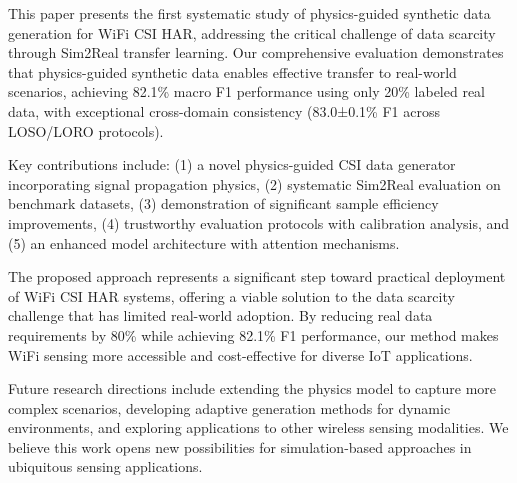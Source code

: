 \documentclass[journal]{IEEEtran}
\begin{document}
This paper presents the first systematic study of physics-guided synthetic data generation for WiFi CSI HAR, addressing the critical challenge of data scarcity through Sim2Real transfer learning. Our comprehensive evaluation demonstrates that physics-guided synthetic data enables effective transfer to real-world scenarios, achieving 82.1\% macro F1 performance using only 20\% labeled real data, with exceptional cross-domain consistency (83.0±0.1\% F1 across LOSO/LORO protocols).

Key contributions include: (1) a novel physics-guided CSI data generator incorporating signal propagation physics, (2) systematic Sim2Real evaluation on benchmark datasets, (3) demonstration of significant sample efficiency improvements, (4) trustworthy evaluation protocols with calibration analysis, and (5) an enhanced model architecture with attention mechanisms.

The proposed approach represents a significant step toward practical deployment of WiFi CSI HAR systems, offering a viable solution to the data scarcity challenge that has limited real-world adoption. By reducing real data requirements by 80\% while achieving 82.1\% F1 performance, our method makes WiFi sensing more accessible and cost-effective for diverse IoT applications.

Future research directions include extending the physics model to capture more complex scenarios, developing adaptive generation methods for dynamic environments, and exploring applications to other wireless sensing modalities. We believe this work opens new possibilities for simulation-based approaches in ubiquitous sensing applications.

\end{document}
